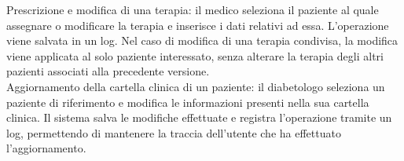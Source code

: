  Prescrizione e modifica di una terapia: il medico seleziona il paziente al quale assegnare o modificare la terapia e inserisce i dati relativi ad essa. L'operazione viene salvata in un log. Nel caso di modifica di una terapia condivisa, la modifica viene applicata al solo paziente interessato, senza alterare la terapia degli altri pazienti associati alla precedente versione.\\
 
 Aggiornamento della cartella clinica di un paziente: il diabetologo seleziona un  paziente di riferimento e modifica le informazioni presenti nella sua cartella clinica. Il sistema salva le modifiche effettuate e registra l'operazione tramite un log, permettendo di mantenere la traccia dell'utente che ha effettuato l'aggiornamento.
 
 
 